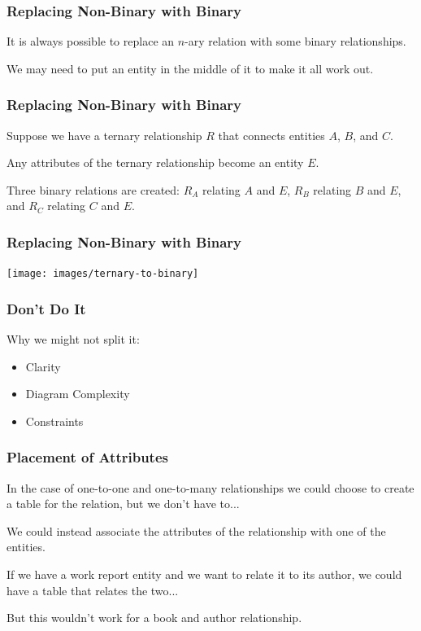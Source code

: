 \begin{frame}
\frametitle{Replacing Non-Binary with Binary}

It is always possible to replace an $n$-ary relation with some binary relationships. 

We may need to put an entity in the middle of it to make it all work out.

\end{frame}



\begin{frame}
\frametitle{Replacing Non-Binary with Binary}

 Suppose we have a ternary relationship $R$ that connects entities $A$, $B$, and $C$. 
 
 Any attributes of the ternary relationship become an entity $E$. 
 
Three binary relations are created: $R_{A}$ relating $A$ and $E$, $R_{B}$ relating $B$ and $E$, and $R_{C}$ relating $C$ and $E$.


\end{frame}



\begin{frame}
\frametitle{Replacing Non-Binary with Binary}

\begin{center}
\texttt{[image: images/ternary-to-binary]}
\end{center}

\end{frame}



\begin{frame}
\frametitle{Don't Do It}

Why we might not split it:

\begin{itemize}
	\item Clarity
	\item Diagram Complexity
	\item Constraints
\end{itemize}

\end{frame}


\begin{frame}
\frametitle{Placement of Attributes}

In the case of one-to-one and one-to-many relationships we could choose to create a table for the relation, but we don't have to... 

We could instead associate the attributes of the relationship with one of the entities. 

If we have a work report entity and we want to relate it to its author, we could have a table that relates the two...

But this wouldn't work for a book and author relationship.

\end{frame}



